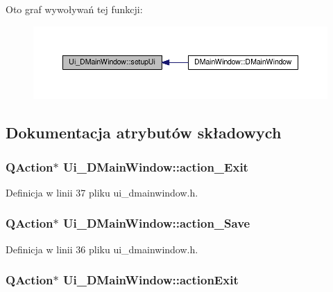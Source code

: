 Oto graf wywoływań tej funkcji\-:\nopagebreak
\begin{figure}[H]
\begin{center}
\leavevmode
\includegraphics[width=350pt]{class_ui___d_main_window_aa53f3a89bf520704a3e79037df2fd451_icgraph}
\end{center}
\end{figure}




\subsection{Dokumentacja atrybutów składowych}
\hypertarget{class_ui___d_main_window_a00e6b795743b676bdf3ed853e91f7029}{
\subsubsection[{action\-\_\-\-Exit}]{\setlength{\rightskip}{0pt plus 5cm}Q\-Action$\ast$ Ui\-\_\-\-D\-Main\-Window\-::action\-\_\-\-Exit}}\label{class_ui___d_main_window_a00e6b795743b676bdf3ed853e91f7029}


Definicja w linii 37 pliku ui\-\_\-dmainwindow.\-h.

\hypertarget{class_ui___d_main_window_a7ab98279e07bdd724a091ea06012c87b}{
\subsubsection[{action\-\_\-\-Save}]{\setlength{\rightskip}{0pt plus 5cm}Q\-Action$\ast$ Ui\-\_\-\-D\-Main\-Window\-::action\-\_\-\-Save}}\label{class_ui___d_main_window_a7ab98279e07bdd724a091ea06012c87b}


Definicja w linii 36 pliku ui\-\_\-dmainwindow.\-h.

\hypertarget{class_ui___d_main_window_ae1fa62a4d27fa0f4a5c63c7c60cfdad2}{
\subsubsection[{action\-Exit}]{\setlength{\rightskip}{0pt plus 5cm}Q\-Action$\ast$ Ui\-\_\-\-D\-Main\-Window\-::action\-Exit}}\label{class_ui___d_main_window_ae1fa62a4d27fa0f4a5c63c7c60cfdad2}


